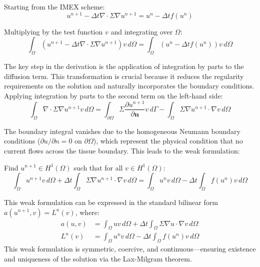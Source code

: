 \documentclass[12pt,a4paper]{article}
\begin{document}
Starting from the IMEX scheme:
\begin{equation}
u^{n+1} - \Delta t \nabla \cdot \Sigma \nabla u^{n+1} = u^n - \Delta t f(u^n)
\end{equation}

Multiplying by the test function $v$ and integrating over $\Omega$:
\begin{equation}
\int_\Omega \left(u^{n+1} - \Delta t \nabla \cdot \Sigma \nabla u^{n+1}\right) v \, d\Omega = \int_\Omega \left(u^n - \Delta t f(u^n)\right) v \, d\Omega
\end{equation}

The key step in the derivation is the application of integration by parts to the diffusion term. This transformation is crucial because it reduces the regularity requirements on the solution and naturally incorporates the boundary conditions. Applying integration by parts to the second term on the left-hand side:
\begin{equation}
\int_\Omega \nabla \cdot \Sigma \nabla u^{n+1} v \, d\Omega = \int_{\partial\Omega} \Sigma \frac{\partial u^{n+1}}{\partial \mathbf{n}} v \, d\Gamma - \int_\Omega \Sigma \nabla u^{n+1} \cdot \nabla v \, d\Omega
\end{equation}

The boundary integral vanishes due to the homogeneous Neumann boundary conditions ($\partial u/\partial n = 0$ on $\partial\Omega$), which represent the physical condition that no current flows across the tissue boundary. This leads to the weak formulation:

Find $u^{n+1} \in H^1(\Omega)$ such that for all $v \in H^1(\Omega)$:
\begin{equation}
\int_\Omega u^{n+1} v \, d\Omega + \Delta t \int_\Omega \Sigma \nabla u^{n+1} \cdot \nabla v \, d\Omega = \int_\Omega u^n v \, d\Omega - \Delta t \int_\Omega f(u^n) v \, d\Omega
\end{equation}

This weak formulation can be expressed in the standard bilinear form $a(u^{n+1}, v) = L^n(v)$, where:
\begin{align}
a(u, v) &= \int_\Omega uv \, d\Omega + \Delta t \int_\Omega \Sigma \nabla u \cdot \nabla v \, d\Omega \\
L^n(v) &= \int_\Omega u^n v \, d\Omega - \Delta t \int_\Omega f(u^n) v \, d\Omega
\end{align}
This weak formulation is symmetric, coercive, and continuous—ensuring existence and uniqueness of the solution via the Lax-Milgram theorem.
\end{document}
